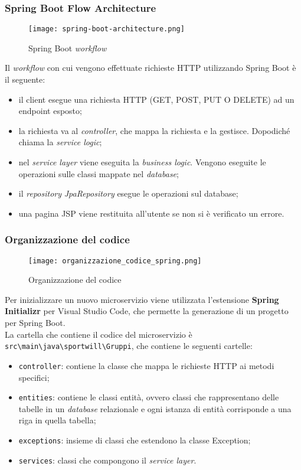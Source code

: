 \subsubsection{Spring Boot Flow Architecture}
\begin{figure}[H] 
    \centering 
    \texttt{[image: spring-boot-architecture.png]} 
    \caption{Spring Boot \textit{workflow}}
\end{figure}
Il \textit{workflow} con cui vengono effettuate richieste HTTP utilizzando Spring Boot è il seguente:
\begin{itemize}
    \item il client esegue una richiesta HTTP (GET, POST, PUT O DELETE) ad un   \gls{endpoint} esposto;
    \item la richiesta va al \textit{controller}, che mappa la richiesta e la gestisce. Dopodiché chiama la \textit{service logic};
    \item nel \textit{service layer} viene eseguita la \textit{business logic}. Vengono eseguite le operazioni sulle classi mappate nel \textit{database};
    \item il \textit{repository} \textit{JpaRepository} esegue le operazioni sul database;
    \item una pagina \gls{JSP} viene restituita all'utente se non si è verificato un errore.
\end{itemize} 

\subsubsection{Organizzazione del codice}

\begin{figure}[H] 
    \centering 
    \texttt{[image: organizzazione\_codice\_spring.png]} 
    \caption{Organizzazione del codice}
\end{figure}
Per inizializzare un nuovo \gls{microservizio} viene utilizzata l'estensione \textbf{Spring Initializr} per Visual Studio Code, che permette la generazione di un progetto per Spring Boot.\\
La cartella che contiene il codice del \gls{microservizio} è \texttt{src\textbackslash main\textbackslash java\textbackslash sportwill\textbackslash Gruppi}, che contiene le seguenti cartelle: 
\begin{itemize}
    \item \texttt{controller}: contiene la classe che mappa le richieste HTTP ai metodi specifici;
    \item \texttt{entities}: contiene le classi entità, ovvero classi che rappresentano delle tabelle in un \textit{database} relazionale e ogni istanza di entità corrisponde a una riga in quella tabella;
    \item \texttt{exceptions}: insieme di classi che estendono la classe Exception;
    \item \texttt{services}: classi che compongono il \textit{service layer}.


\end{itemize}
